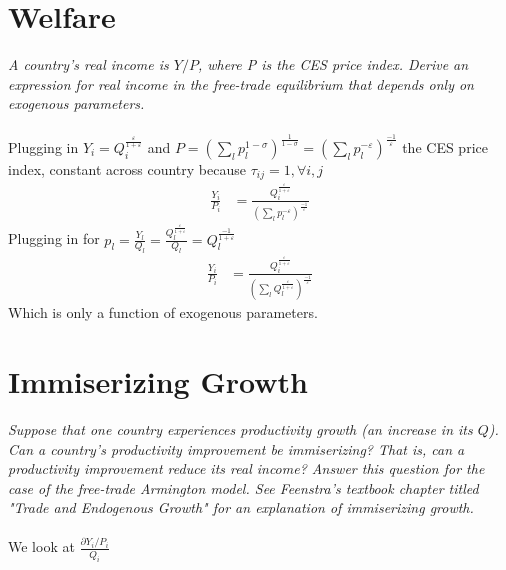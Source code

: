 \documentclass[10pt, final]{article}
\def\e{\varepsilon}
\def\s{\sigma}
\newcommand{\pa}{\mathcal \partial}
\begin{document}
\section{Welfare} %
\label{sec:welfare}

\textit{A country's real income is $Y/P$, where P is the CES price index. Derive an expression for real income in the free-trade equilibrium that depends only on exogenous parameters.}
\\
\\
Plugging in $Y_i = Q_i^{\frac{\e}{1+\e}}$ and $P= (\sum_l p_l^{1-\s})^{\frac{1}{1-\s}} = (\sum_l p_l^{-\e})^{\frac{-1}{\e}}$ the CES price index, constant across country because $\tau_{ij} = 1, \forall i, j$
\begin{align*}
	\frac{Y_i}{P_i} &= \frac{Q_i^{\frac{\e}{1+\e}}}{(\sum_l p_l^{-\e})^{\frac{-1}{\e}}}
\end{align*}
Plugging in for $ p_l = \frac{Y_l}{Q_l} = \frac{Q_l^{\frac{\e}{1+\e}}}{Q_l} = Q_l^{\frac{-1}{1+\e}}$
\begin{align*}
	\frac{Y_i}{P_i} &= \frac{Q_i^{\frac{\e}{1+\e}}}{(\sum_l Q_l^{\frac{\e}{1+\e}})^{\frac{-1}{\e}}}
\end{align*}
Which is only a function of exogenous parameters.


\section{Immiserizing Growth} %
\label{sec:immiserizing_growth}

\textit{Suppose that one country experiences productivity growth (an increase in its $Q$). Can a country's productivity improvement be immiserizing? That is, can a productivity improvement reduce its real income? Answer this question for the case of the free-trade Armington model. See Feenstra's textbook chapter titled "Trade and Endogenous Growth" for an explanation of immiserizing growth.}
\\
\\
We look at $\frac{\pa Y_i / P_i}{Q_i}$
\end{document}
